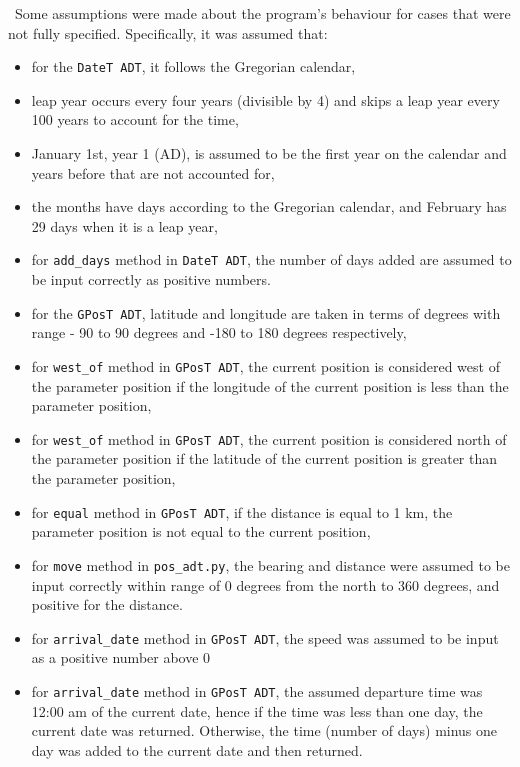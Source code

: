 \documentclass[12pt]{article}
\begin{document}
~\newline\noindent Some assumptions were made about the program's behaviour for 
cases that were not fully specified. Specifically, it was assumed that:
\begin{itemize}
	\item for the {\tt DateT ADT}, it follows the Gregorian calendar,
	\item leap year occurs every four years (divisible by 4) and skips a leap year every 100 years to account for the time,
	\item January 1st, year 1 (AD), is assumed to be the first year on the calendar and years before that are not accounted for,
	\item the months have days according to the Gregorian calendar, and February has 29 days when it is a leap year,
   \item for \texttt{add\_days} method in {\tt DateT ADT}, the number of days added are assumed to be input correctly as positive numbers.
   \item for the {\tt GPosT ADT}, latitude and longitude are taken in terms of degrees with range - 90 to 90 degrees and -180 to 180 degrees respectively,
	\item for \texttt{west\_of} method in {\tt GPosT ADT}, the current position is considered west of the parameter position if the longitude of the current position is less than the parameter position,
	\item for \texttt{west\_of} method in {\tt GPosT ADT}, the current position is considered north of the parameter position if the latitude of the current position is greater than the parameter position,
	\item for \texttt{equal} method in {\tt GPosT ADT}, if the distance is equal to 1 km, the parameter position is not equal to the current position,
	\item for \texttt{move} method in {\tt pos\_adt.py}, the bearing and distance were assumed to be input correctly within range of 0 degrees from the north to 360 degrees, and positive for the distance.
	\item for \texttt{arrival\_date} method in {\tt GPosT ADT}, the speed was assumed to be input as a positive number above 0
	\item for \texttt{arrival\_date} method in {\tt GPosT ADT}, the assumed departure time was 12:00 am of the current date, hence if the time was less than one day, the current date was returned. Otherwise, the time (number of days) minus one day was added to the current date and then returned.
\end{itemize}
\end{document}
